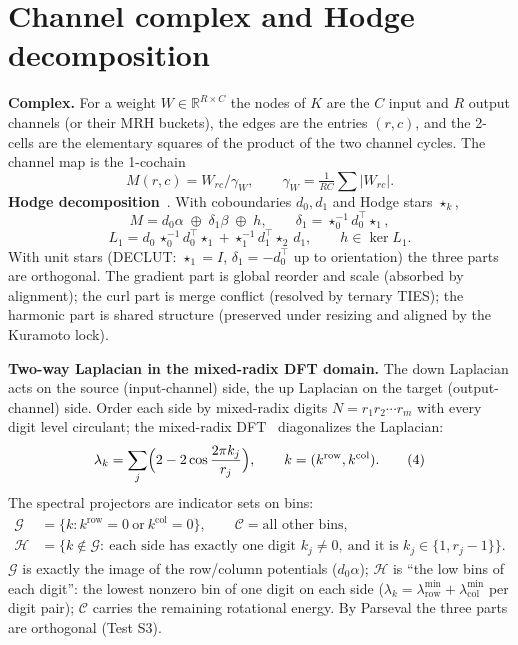 \documentclass[11pt]{article}
\begin{document}
\section{Channel complex and Hodge decomposition}
\textbf{Complex.} For a weight $W\in\mathbb{R}^{R\times C}$ the nodes of $K$ are the $C$ input and $R$ output channels (or their MRH buckets), the edges are the entries $(r,c)$, and the 2-cells are the elementary squares of the product of the two channel cycles. The channel map is the 1-cochain
\begin{equation}M(r,c)=W_{rc}/\gamma_W,\qquad \gamma_W=\tfrac{1}{RC}\textstyle\sum|W_{rc}|.\tag{1}\end{equation}
\textbf{Hodge decomposition}~\cite{lim,hirani}. With coboundaries $d_0,d_1$ and Hodge stars $\star_k$,
\begin{equation}M=d_0\alpha\;\oplus\;\delta_1\beta\;\oplus\;h,\qquad \delta_1=\star_0^{-1}d_0^{\top}\star_1 ,\tag{2}\end{equation}
\begin{equation}L_1=d_0\,\star_0^{-1}d_0^{\top}\star_1+\star_1^{-1}d_1^{\top}\star_2\,d_1,\qquad h\in\ker L_1 .\tag{3}\end{equation}
With unit stars (DECLUT: $\star_1=I$, $\delta_1=-d_0^{\top}$ up to orientation) the three parts are orthogonal. The gradient part is global reorder and scale (absorbed by alignment); the curl part is merge conflict (resolved by ternary TIES); the harmonic part is shared structure (preserved under resizing and aligned by the Kuramoto lock).

\textbf{Two-way Laplacian in the mixed-radix DFT domain.} The down Laplacian acts on the source (input-channel) side, the up Laplacian on the target (output-channel) side. Order each side by mixed-radix digits $N=r_1r_2\cdots r_m$ with every digit level circulant; the mixed-radix DFT~\cite{cooleytukey} diagonalizes the Laplacian:
\begin{equation}\lambda_k=\sum_{j}\Bigl(2-2\cos\frac{2\pi k_j}{r_j}\Bigr),\qquad k=(k^{\mathrm{row}},k^{\mathrm{col}}).\tag{4}\end{equation}
The spectral projectors are indicator sets on bins:
\begin{equation}\begin{aligned}\mathcal G&=\{k:k^{\mathrm{row}}=0\ \text{or}\ k^{\mathrm{col}}=0\},\qquad \mathcal C=\text{all other bins},\\
\mathcal H&=\{k\notin\mathcal G:\ \text{each side has exactly one digit }k_j\neq0,\ \text{and it is }k_j\in\{1,r_j-1\}\}.\end{aligned}\tag{5}\end{equation}
$\mathcal G$ is exactly the image of the row/column potentials ($d_0\alpha$); $\mathcal H$ is ``the low bins of each digit'': the lowest nonzero bin of one digit on each side ($\lambda_k=\lambda^{\min}_{\mathrm{row}}+\lambda^{\min}_{\mathrm{col}}$ per digit pair); $\mathcal C$ carries the remaining rotational energy. By Parseval the three parts are orthogonal (Test S3).
\end{document}
